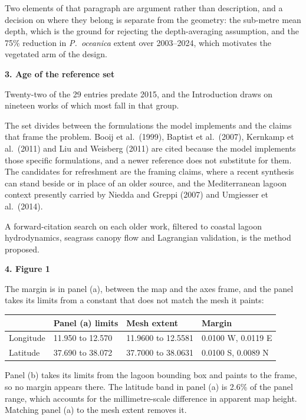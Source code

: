 \documentclass[11pt]{article}
\newcommand{\itemhead}[1]{\vspace{0.3em}\noindent\textbf{#1}\par}
\begin{document}
Two elements of that paragraph are argument rather than description, and a
decision on where they belong is separate from the geometry: the sub-metre mean
depth, which is the ground for rejecting the depth-averaging assumption, and
the 75\% reduction in \emph{P.\ oceanica} extent over 2003--2024, which
motivates the vegetated arm of the design.

\itemhead{3. Age of the reference set}

Twenty-two of the 29 entries predate 2015, and the Introduction draws on
nineteen works of which most fall in that group.

The set divides between the formulations the model implements and the claims
that frame the problem. Booij et al.\ (1999), Baptist et al.\ (2007), Kernkamp
et al.\ (2011) and Liu and Weisberg (2011) are cited because the model implements
those specific formulations, and a newer reference does not substitute for
them. The candidates for refreshment are the framing claims, where a recent
synthesis can stand beside or in place of an older source, and the
Mediterranean lagoon context presently carried by Niedda and Greppi (2007) and
Umgiesser et al.\ (2014).

A forward-citation search on each older work, filtered to coastal lagoon
hydrodynamics, seagrass canopy flow and Lagrangian validation, is the method
proposed.

\itemhead{4. Figure 1}

The margin is in panel (a), between the map and the axes frame, and the panel
takes its limits from a constant that does not match the mesh it paints:

\begin{center}
\begin{tabular}{llll}
\toprule
 & Panel (a) limits & Mesh extent & Margin \\
\midrule
Longitude & 11.950 to 12.570 & 11.9600 to 12.5581 & 0.0100 W, 0.0119 E \\
Latitude  & 37.690 to 38.072 & 37.7000 to 38.0631 & 0.0100 S, 0.0089 N \\
\bottomrule
\end{tabular}
\end{center}

Panel (b) takes its limits from the lagoon bounding box and paints to the
frame, so no margin appears there. The latitude band in panel (a) is 2.6\% of
the panel range, which accounts for the millimetre-scale difference in apparent
map height. Matching panel (a) to the mesh extent removes it.
\end{document}
